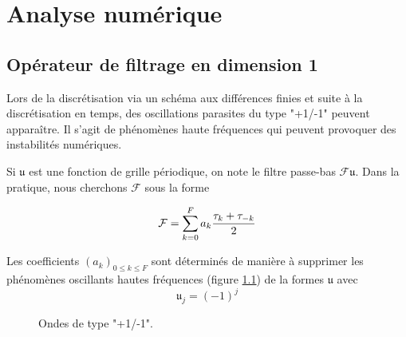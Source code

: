 \chapter{Analyse numérique}

\section{Opérateur de filtrage en dimension 1}

Lors de la discrétisation via un schéma aux différences finies et suite à la discrétisation en temps, des oscillations parasites du type "+1/-1" peuvent apparaître. Il s'agit de phénomènes haute fréquences qui peuvent provoquer des instabilités numériques. 

Si $\mathfrak{u}$ est une fonction de grille périodique, on note le filtre passe-bas $\mathcal{F}\mathfrak{u}$. Dans la pratique, nous cherchons $\mathcal{F}$ sous la forme 

\begin{equation}
\mathcal{F} = \displaystyle\sum\limits_{k=0}^F a_k \dfrac{\tau_k + \tau_{-k}}{2}
\label{eq:ftr}
\end{equation}

Les coefficients $(a_k)_{0 \leq k \leq F}$ sont déterminés de manière à supprimer les phénomènes oscillants hautes fréquences (figure \ref{fig:hf_waves}) de la formes $\mathfrak{u}$ avec 
\begin{equation}
\mathfrak{u}_j = (-1)^j
\end{equation}

\begin{figure}[htbp]
\begin{center}
\end{center}
\caption{Ondes de type "+1/-1".}
\label{fig:hf_waves}
\end{figure}


